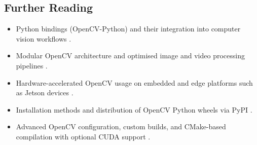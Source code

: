 

\subsection{Further Reading}

\begin{itemize}
	\item Python bindings (OpenCV-Python) and their integration into computer vision workflows \cite{opencv_py_intro}.
	\item Modular OpenCV architecture and optimised image and video processing pipelines \cite{opencv_lfs}.
	\item Hardware-accelerated OpenCV usage on embedded and edge platforms such as Jetson devices \cite{opencv_on_wheels}.
	\item Installation methods and distribution of OpenCV Python wheels via PyPI \cite{opencv_pypi}.
	\item Advanced OpenCV configuration, custom builds, and CMake-based compilation with optional CUDA support \cite{opencv_config_ref}.
\end{itemize}
